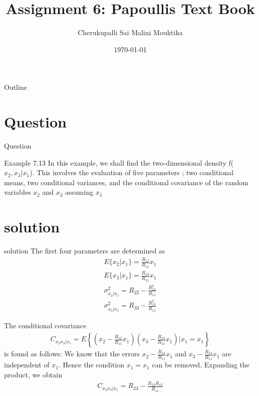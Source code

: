 \documentclass{beamer}
\title{Assignment 6: Papoullis Text Book}
\author{Cherukupalli Sai Malini Mouktika}
\date{\today}
\numberwithin{equation}{subsection}
\begin{document}
\begin{frame}
    \titlepage 
\end{frame}

\logo{}

\begin{frame}{Outline}
    \tableofcontents
\end{frame}
\section{Question}
\begin{frame}{Question}
    \begin{block}{Example 7.13}
    In this example, we shall find the two-dimensional density f($x_{2}, x_{3}| x_{1}$). This involves the evaluation of five parameters ; two conditional means, two conditional variances, and the conditional covariance of the random variables $x_{2}$ and $x_{3}$ assuming $x_{1}$
\end{block}
\end{frame}
\section{solution}
\begin{frame}{solution}
The first four parameters are determined as
\begin{align}
E\{x_{2} | x_{1}\} = \frac{R_{12}}{R_{11}}x_{1}\\
E\{x_{3} | x_{1}\} = \frac{R_{13}}{R_{11}}x_{1}\\
\sigma^{2}_{x_{2}|x_{1}} = R_{22}-\frac{R^{2}_{12}}{R_{11}}\\
\sigma^{2}_{x_{3}|x_{1}} = R_{33}-\frac{R^{2}_{13}}{R_{11}}
\end{align}
\end{frame}
\begin{frame}
The conditional covariance
\begin{align}
  C_{x_{2}x_{3}|x_{1}} = E\left\lbrace\left(x_{2}-\frac{R_{12}}{R_{11}}x_{1}\right)\left(x_{3}-\frac{R_{13}}{R_{11}}x_{1}\right)\biggr|x_{1} = x_{1}\right\rbrace
\end{align}
is found as follows: We know that the errors $x_{2}-\frac{R_{12}}{R_{11}}x_{1}$ and $x_{3}-\frac{R_{13}}{R_{11}}x_{1}$ are 
independent of $x_{1}$. Hence the condition $x_{1} = x_{1}$  can be removed. Expanding the product, we obtain \\
\begin{align}
C_{x_{2}x_{3}|x_{1}} = R_{23}-\frac{R_{12}R_{13}}{R_{11}}
\end{align}
\end{frame}
\end{document}
